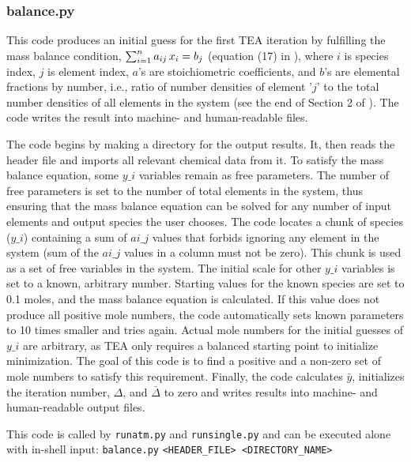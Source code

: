 \subsubsection{balance.py}

This code produces an initial guess for the first TEA iteration by
fulfilling the mass balance condition, $\sum\sb{i=1}^n a\sb{ij}\,
x\sb{i} = b\sb{j}$ (equation (17)
in \citealp{BlecicEtal2016-TEAtheory}), where $i$ is species index,
$j$ is element index, $a$'s are stoichiometric coefficients, and $b$'s
are elemental fractions by number, i.e., ratio of number densities of
element '$j$' to the total number densities of all elements in the
system (see the end of Section 2
of \citealp{BlecicEtal2016-TEAtheory}).  The code writes the result
into machine- and human-readable files.

The code begins by making a directory for the output results. It, then
reads the header file and imports all relevant chemical data from it.
To satisfy the mass balance equation, some $y\_i$ variables remain as
free parameters. The number of free parameters is set to the number of
total elements in the system, thus ensuring that the mass balance
equation can be solved for any number of input elements and output
species the user chooses. The code locates a chunk of species ($y\_i$)
containing a sum of $ai\_j$ values that forbids ignoring any element
in the system (sum of the $ai\_j$ values in a column must not be
zero). This chunk is used as a set of free variables in the
system. The initial scale for other $y\_i$ variables is set to a
known, arbitrary number. Starting values for the known species are set
to 0.1 moles, and the mass balance equation is calculated. If this
value does not produce all positive mole numbers, the code
automatically sets known parameters to 10 times smaller and tries
again. Actual mole numbers for the initial guesses of $y\_i$ are
arbitrary, as TEA only requires a balanced starting point to
initialize minimization. The goal of this code is to find a positive
and a non-zero set of mole numbers to satisfy this
requirement. Finally, the code calculates $\bar{y}$, initializes the
iteration number, $\Delta$, and $\bar{\Delta}$ to zero and writes
results into machine- and human-readable output files.

This code is called by \texttt {runatm.py} and \texttt {runsingle.py}
and can be executed alone with in-shell input: \texttt
{balance.py} \texttt{<HEADER\_FILE> <DIRECTORY\_NAME>}



